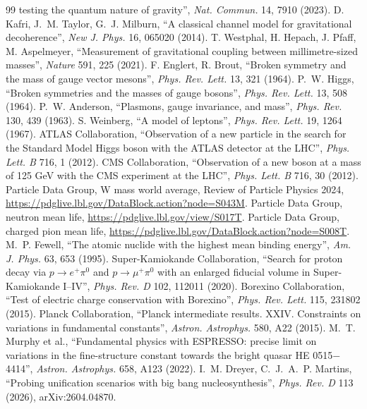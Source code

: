 \documentclass[11pt,a4paper]{article}
\theoremstyle{definition}
\theoremstyle{remark}
\begin{document}
\begin{thebibliography}{99}
testing the quantum nature of gravity'', \emph{Nat. Commun.} 14, 7910 (2023).
 D. Kafri, J.~M. Taylor, G.~J. Milburn, ``A classical channel model for gravitational decoherence'', \emph{New J. Phys.} 16,
065020 (2014).
 T. Westphal, H. Hepach, J. Pfaff, M. Aspelmeyer, ``Measurement of gravitational coupling between millimetre-sized
masses'', \emph{Nature} 591, 225 (2021).
 F. Englert, R. Brout, ``Broken symmetry and the mass of gauge vector mesons'', \emph{Phys. Rev. Lett.} 13, 321 (1964).
 P.~W. Higgs, ``Broken symmetries and the masses of gauge bosons'', \emph{Phys. Rev. Lett.} 13, 508 (1964).
 P.~W. Anderson, ``Plasmons, gauge invariance, and mass'', \emph{Phys. Rev.} 130, 439 (1963).
 S. Weinberg, ``A model of leptons'', \emph{Phys. Rev. Lett.} 19, 1264 (1967).
 ATLAS Collaboration, ``Observation of a new particle in the search for the Standard Model Higgs boson with the ATLAS
detector at the LHC'', \emph{Phys. Lett. B} 716, 1 (2012).
 CMS Collaboration, ``Observation of a new boson at a mass of 125 GeV with the CMS experiment at the LHC'', \emph{Phys.
Lett. B} 716, 30 (2012).
 Particle Data Group, W mass world average, Review of Particle Physics 2024, \url{https://pdglive.lbl.gov/DataBlock.action?node=S043M}.
 Particle Data Group, neutron mean life, \url{https://pdglive.lbl.gov/view/S017T}.
 Particle Data Group, charged pion mean life, \url{https://pdglive.lbl.gov/DataBlock.action?node=S008T}.
 M.~P. Fewell, ``The atomic nuclide with the highest mean binding energy'', \emph{Am. J. Phys.} 63, 653 (1995).
 Super-Kamiokande Collaboration, ``Search for proton decay via $p\to e^+\pi^0$ and $p\to\mu^+\pi^0$ with an enlarged
fiducial volume in Super-Kamiokande I--IV'', \emph{Phys. Rev. D} 102, 112011 (2020).
 Borexino Collaboration, ``Test of electric charge conservation with Borexino'', \emph{Phys. Rev. Lett.} 115, 231802
(2015).
 Planck Collaboration, ``Planck intermediate results. XXIV. Constraints on variations in fundamental constants'',
\emph{Astron. Astrophys.} 580, A22 (2015).
 M.~T. Murphy et al., ``Fundamental physics with ESPRESSO: precise limit on variations in the fine-structure constant
towards the bright quasar HE 0515$-$4414'', \emph{Astron. Astrophys.} 658, A123 (2022).
 I.~M. Dreyer, C.~J.~A.~P. Martins, ``Probing unification scenarios with big bang nucleosynthesis'', \emph{Phys. Rev. D} 113 (2026), arXiv:2604.04870.

\end{thebibliography}
\end{document}
